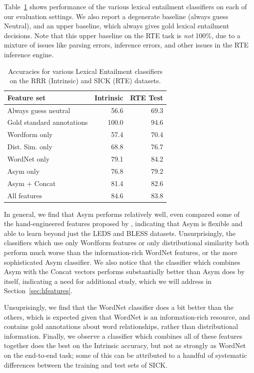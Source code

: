 \documentclass[12pt]{article}
\begin{document}
Table~\ref{tab:evallexical} shows performance of the various lexical entailment
classifiers on each of our evaluation settings. We also report a degenerate
baseline (always guess Neutral), and an upper baseline, which always gives gold
lexical entailment decisions. Note that this upper baseline on the RTE
task is {\em not} 100\%, due to a mixture of issues like parsing errors,
inference errors, and other issues in the RTE inference engine.

\begin{table}
\centering
\begin{tabular}{|lrr|}
    \hline
    {\bf Feature set} & {\bf Intrinsic} & {\bf RTE Test}\\
    \hline
    Always guess neutral & 56.6 & 69.3 \\
    Gold standard annotations&100.0 & 94.6 \\
    \hline
    Wordform only        & 57.4 & 70.4 \\
    Dist. Sim. only      & 68.8 & 76.7 \\
    WordNet only         & 79.1 & 84.2 \\
    Asym only            & 76.8 & 79.2 \\
    Asym + Concat        & 81.4 & 82.6 \\
    \hline
    All features         & 84.6 & 83.8 \\
    \hline
\end{tabular}
\caption{Accuracies for various Lexical Entailment classifiers on the RRR (Intrinsic) and SICK (RTE) datasets.}
\label{tab:evallexical}
\end{table}

In general, we find that Asym performs relatively well, even compared some of
the hand-engineered features proposed by , indicating
that Asym is flexible and able to learn beyond just the LEDS and BLESS datasets.
Unsurprisingly, the classifiers which use only Wordform features or only
distributional similarity both perform much worse than the information-rich
WordNet features, or the more sophisticated Asym classifier.
We also notice that the classifier which combines Asym with the Concat
vectors performs substantially better than Asym does by itself, indicating
a need for additional study, which we will address in
Section~\ref{sec:hfeatures}.

Unsuprisingly, we find that the WordNet classifier does a bit better than the
others, which is expected given that WordNet is an information-rich resource,
and contains gold annotations about word relationships, rather than
distributional information.  Finally, we observe a classifier which combines
all of these features together does the best on the Intrinsic accuracy, but not
as strongly as WordNet on the end-to-end task; some of this can be attributed
to a handful of systematic differences between the training and test sets of
SICK.
\end{document}

